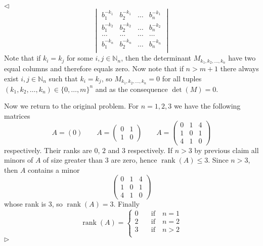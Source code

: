 \documentclass[12pt]{article}
\newenvironment{solution}{\par $\triangleleft$}{$\triangleright$}
\begin{document}
\begin{solution}
$$\begin{vmatrix}
            b_1^{-k_1} &
            b_2^{-k_1} &
            \ldots     &
            b_n^{-k_1}   \\
            b_1^{-k_2} &
            b_2^{-k_2} &
            \ldots     &
            b_n^{-k_2}   \\
            \ldots     &
            \ldots     &
            \ldots     &
            \ldots       \\
            b_1^{-k_n} &
            b_2^{-k_n} &
            \ldots     &
            b_n^{-k_n}   \\
        \end{vmatrix}
    $$
    Note that if $k_i=k_j$ for some $i,j\in\mathbb{N}_n$, then the determinant
    $M_{k_1,k_2,\ldots,k_n}$ have two equal columns and therefore equals zero.
    Now note that if $n>m+1$ there always exist $i,j\in\mathbb{N}_n$ such that
    $k_i=k_j$, so $M_{k_1,k_2,\ldots,k_n}=0$ for all tuples
    $(k_1,k_2,\ldots,k_n)\in {\{0,\ldots,m\}}^n$ and as the consequence
    $\det(M)=0$.

    Now we return to the original problem. For $n=1,2,3$ we have the following
    matrices
    $$
        A=(0)\qquad
        A=\begin{pmatrix}0&1\\1&0\end{pmatrix}\qquad
        A=\begin{pmatrix}0&1&4\\1&0&1\\4&1&0 \end{pmatrix}
    $$
    respectively. Their ranks are $0$, $2$ and $3$ respectively. If $n>3$ by
    previous claim all minors of $A$ of size greater than $3$ are zero, hence
    $\operatorname{rank}(A)\leq 3$. Since $n>3$, then $A$ contains a minor
    $$
        \begin{pmatrix}0&1&4\\1&0&1\\4&1&0 \end{pmatrix}
    $$
    whose rank is $3$, so $\operatorname{rank}(A)=3$. Finally
    $$
        \operatorname{rank}(A)=
        \begin{cases}
            0 & \quad\mbox{if}\quad n=1 \\
            2 & \quad\mbox{if}\quad n=2 \\
            3 & \quad\mbox{if}\quad n>2 \\
        \end{cases}
    $$
\end{solution}
\end{document}
